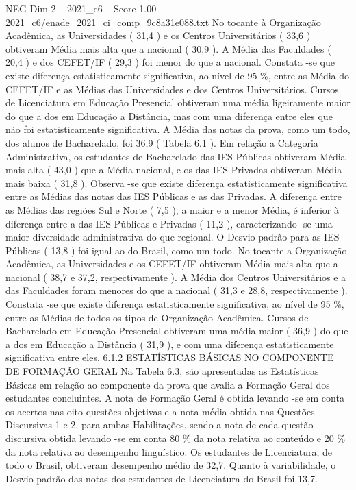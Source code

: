 \begin{textsample}{NEG Dim 2 – 2021\_c6 – Score 1.00 – 2021\_c6/enade\_2021\_ci\_comp\_9c8a31e088.txt}
No tocante à Organização Acadêmica, as Universidades ( 31,4 ) e os Centros Universitários ( 33,6 ) obtiveram Média mais alta que a nacional ( 30,9 ).
A Média das Faculdades ( 20,4 ) e dos CEFET/IF ( 29,3 ) foi menor do que a nacional.
Constata -se que existe diferença estatisticamente significativa, ao nível de 95 \%, entre as Média do CEFET/IF e as Médias das Universidades e dos Centros Universitários.
Cursos de Licenciatura em Educação Presencial obtiveram uma média ligeiramente maior do que a dos em Educação a Distância, mas com uma diferença entre eles que não foi estatisticamente significativa.
A Média das notas da prova, como um todo, dos alunos de Bacharelado, foi 36,9 ( Tabela 6.1 ).
Em relação a Categoria Administrativa, os estudantes de Bacharelado das IES Públicas obtiveram Média mais alta ( 43,0 ) que a Média nacional, e os das IES Privadas obtiveram Média mais baixa ( 31,8 ).
Observa -se que existe diferença estatisticamente significativa entre as Médias das notas das IES Públicas e as das Privadas.
A diferença entre as Médias das regiões Sul e Norte ( 7,5 ), a maior e a menor Média, é inferior à diferença entre a das IES Públicas e Privadas ( 11,2 ), caracterizando -se uma maior diversidade administrativa do que regional.
O Desvio padrão para as IES Públicas ( 13,8 ) foi igual ao do Brasil, como um todo.
No tocante a Organização Acadêmica, as Universidades e os CEFET/IF obtiveram Média mais alta que a nacional ( 38,7 e 37,2, respectivamente ).
A Média dos Centros Universitários e a das Faculdades foram menores do que a nacional ( 31,3 e 28,8, respectivamente ).
Constata -se que existe diferença estatisticamente significativa, ao nível de 95 \%, entre as Médias de todos os tipos de Organização Acadêmica.
Cursos de Bacharelado em Educação Presencial obtiveram uma média maior ( 36,9 ) do que a dos em Educação a Distância ( 31,9 ), e com uma diferença estatisticamente significativa entre eles. 6.1.2 ESTATÍSTICAS BÁSICAS NO COMPONENTE DE FORMAÇÃO GERAL Na Tabela 6.3, são apresentadas as Estatísticas Básicas em relação ao componente da prova que avalia a Formação Geral dos estudantes concluintes.
A nota de Formação Geral é obtida levando -se em conta os acertos nas oito questões objetivas e a nota média obtida nas Questões Discursivas 1 e 2, para ambas Habilitações, sendo a nota de cada questão discursiva obtida levando -se em conta 80 \% da nota relativa ao conteúdo e 20 \% da nota relativa ao desempenho linguístico.
Os estudantes de Licenciatura, de todo o Brasil, obtiveram desempenho médio de 32,7.
Quanto à variabilidade, o Desvio padrão das notas dos estudantes de Licenciatura do Brasil foi 13,7.

\end{textsample}
